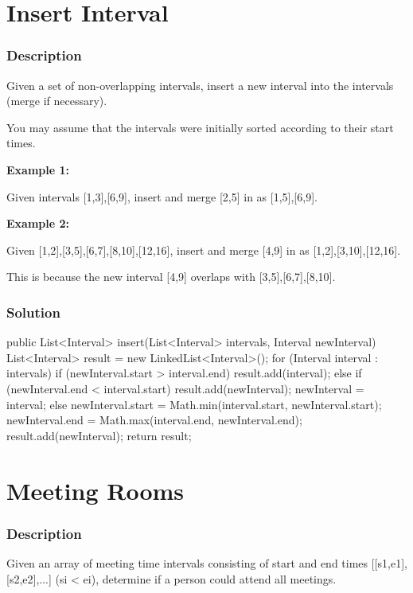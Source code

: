 \newpage

\section{Insert Interval} %

\subsubsection{Description}
Given a set of non-overlapping intervals, insert a new interval into the intervals (merge if necessary).

You may assume that the intervals were initially sorted according to their start times.

\textbf{Example 1:}

Given intervals [1,3],[6,9], insert and merge [2,5] in as [1,5],[6,9].

\textbf{Example 2:}

Given [1,2],[3,5],[6,7],[8,10],[12,16], insert and merge [4,9] in as [1,2],[3,10],[12,16].

This is because the new interval [4,9] overlaps with [3,5],[6,7],[8,10].

\subsubsection{Solution}

\begin{Code}
public List<Interval> insert(List<Interval> intervals, Interval newInterval) {
    List<Interval> result = new LinkedList<Interval>();
    for (Interval interval : intervals) {
        if (newInterval.start > interval.end) {
            result.add(interval);
        } else if (newInterval.end < interval.start) {
            result.add(newInterval);
            newInterval = interval;
        } else {
            newInterval.start = Math.min(interval.start, newInterval.start);
            newInterval.end = Math.max(interval.end, newInterval.end);
        }
    }
    result.add(newInterval);
    return result;
}
\end{Code}

\newpage

\section{Meeting Rooms} %

\subsubsection{Description}
Given an array of meeting time intervals consisting of start and end times [[s1,e1],[s2,e2],...] (si < ei), determine if a person could attend all meetings.

